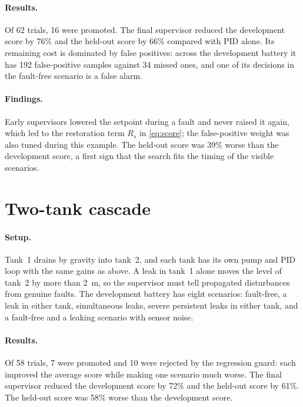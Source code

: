 \paragraph{Results.} Of 62 trials, 16 were promoted. The final supervisor
reduced the development score by 76\% and the held-out score by 66\%
compared with PID alone. Its remaining cost is dominated by false positives:
across the development battery it has 192 false-positive samples against 34
missed ones, and one of its decisions in the fault-free scenario is a false
alarm.

\paragraph{Findings.} Early supervisors lowered the setpoint during a fault
and never raised it again, which led to the restoration term $R_s$ in
\eqref{eq:score}; the false-positive weight was also tuned during this
example. The held-out score was 39\% worse than the development score, a
first sign that the search fits the timing of the visible scenarios.

\section{Two-tank cascade}
\label{sec:two}
\paragraph{Setup.} Tank~1 drains by gravity into tank~2, and each tank has
its own pump and PID loop with the same gains as above. A leak in tank~1
alone moves the level of tank~2 by more than 2~m, so the supervisor must tell
propagated disturbances from genuine faults. The development battery has
eight scenarios: fault-free, a leak in either tank, simultaneous leaks,
severe persistent leaks in either tank, and a fault-free and a leaking
scenario with sensor noise.

\paragraph{Results.} Of 58 trials, 7 were promoted and 10 were rejected by
the regression guard: each improved the average score while making one
scenario much worse. The final supervisor reduced the development score by
72\% and the held-out score by 61\%. The held-out score was 58\% worse than
the development score.

